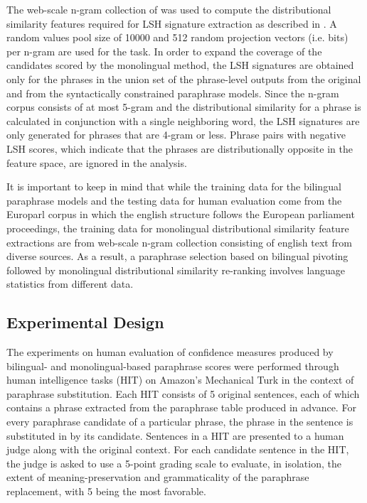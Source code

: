 \documentclass[11pt]{article}
\begin{document}
The web-scale n-gram collection of  was used to compute the distributional similarity features required for LSH signature extraction as described in . A random values pool size of 10000 and 512 random projection vectors (i.e. bits) per n-gram are used for the task. In order to expand the coverage of the candidates scored by the monolingual method, the LSH signatures are obtained only for the phrases in the union set of the phrase-level outputs from the original and from the syntactically constrained paraphrase models. Since the n-gram corpus consists of at most 5-gram and the distributional similarity for a phrase is calculated in conjunction with a single neighboring word, the LSH signatures are only generated for phrases that are 4-gram or less. Phrase pairs with negative LSH scores, which indicate that the phrases are distributionally opposite in the feature space, are ignored in the analysis.

It is important to keep in mind that while the training data for the bilingual paraphrase models and the testing data for human evaluation come from the Europarl corpus in which the english structure follows the European parliament proceedings, the training data for monolingual distributional similarity feature extractions are from web-scale n-gram collection consisting of english text from diverse sources. As a result, a paraphrase selection based on bilingual pivoting followed by monolingual distributional similarity re-ranking involves language statistics from different data.

\subsection{Experimental Design}
The experiments on human evaluation of confidence measures produced by bilingual- and monolingual-based paraphrase scores were performed through human intelligence tasks (HIT) on Amazon's Mechanical Turk in the context of paraphrase substitution.  Each HIT consists of 5 original sentences, each of which contains a phrase extracted from the paraphrase table produced in advance. For every paraphrase candidate of a particular phrase, the phrase in the sentence is substituted in by its candidate. Sentences in a HIT are presented to a human judge along with the original context. For each candidate sentence in the HIT, the judge is asked to use a 5-point grading scale to evaluate, in isolation, the extent of meaning-preservation and grammaticality of the paraphrase replacement, with 5 being the most favorable. 
\end{document}
